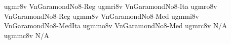 \documentclass[test]{vnsample}
\begin{document}
\begin{shortsample}
  {ugmr8v}   {VnGaramondNo8-Reg}
 {ugmri8v}  {VnGaramondNo8-Ita}
 {ugmro8v}  {VnGaramondNo8-Reg}
  {ugmm8v}   {VnGaramondNo8-Med}
 {ugmmi8v}  {VnGaramondNo8-MedIta}
 {ugmmo8v}  {VnGaramondNo8-Med}
 {ugmrc8v}  {N/A}
 {ugmmc8v}  {N/A}
\end{shortsample}
\end{document}
